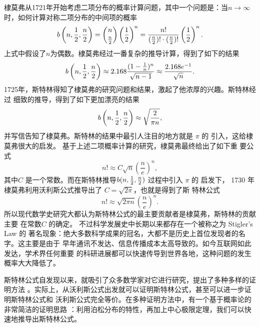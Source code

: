 {棣莫弗从1721年开始考虑二项分布的概率计算问题，其中一个问题是：当$n \rightarrow
\infty $时，如何计算对称二项分布的中间项的概率
$$ b\left(n, {1\over2}, {n \over 2}\right) = \binom{n}{{n \over 2}} 
\left(\frac{1}{2}\right)^n 
= \frac{n!}{({n\over 2})! \cdot ({n \over 2})!} \left(\frac{1}{2}\right)^n .$$
上式中假设了$n$为偶数。棣莫弗经过一番复杂的推导计算，得到了如下的结果
$$ b\left(n, {1\over2}, {n\over2}\right) \approx  2.168 \frac{(1 - {1\over n})^n} {\sqrt{n-1}} 
\approx \frac{2.168 e^{-1}}{\sqrt{n}}.$$
1725年，斯特林得知了棣莫弗的研究问题和结果，激起了他浓厚的兴趣。斯特林经过
细致的推导，得到了如下更加漂亮的结果
$$ b\left(n, {1\over2}, {n\over2}\right) \approx \sqrt{\frac{2}{\pi n}} ,$$
并写信告知了棣莫弗。斯特林的结果中最引人注目的地方就是 $\pi$ 的
引入，这给棣莫弗很大的启发。 基于上述二项概率计算的研究，棣莫弗最终给出了如下重
要公式
$$ n! \approx C \sqrt{n} \left(\frac{n}{e}\right)^{n} ,$$
其中$C$ 是一个常数。而在斯特林推导$b(n, {1\over2}, {n\over2})$ 过程中引入 $\pi$ 的
启发下， 1730 年棣莫弗利用沃利斯公式推导出了 $C = \sqrt{2\pi}$，也就是得到了斯
特林公式
$$ n! \approx \sqrt{2\pi n} \left(\frac{n}{e}\right)^{n} .$$
所以现代数学史研究大都认为斯特林公式的最主要贡献者是棣莫弗，斯特林的贡献主要
在常数$C$ 的确定。 不过科学发展史中长期以来都存在一个被称之为 Stigler's Law 的
著名现象：绝大多数科学成果的冠名，大都不是历史上首位发现者的名字。这主要是由于
早年通讯不发达、信息传播成本太高导致的。如今互联网如此发达，学术界任何重要
的科研进展都可以快速传导到世界各地，这种问题的发生概率大大降低了。 

斯特林公式自发现以来，就吸引了众多数学家对它进行研究，提出了多种多样的证明方法
。实际上，从沃利斯公式出发就可以证明斯特林公式，甚至可以进一步证明斯特林公式和
沃利斯公式完全等价。在多种证明方法中，有一个基于概率论的非常简洁的证明思路
：利用泊松分布的特性，再加上中心极限定理，我们可以快速地推导出斯特林公式。

}

